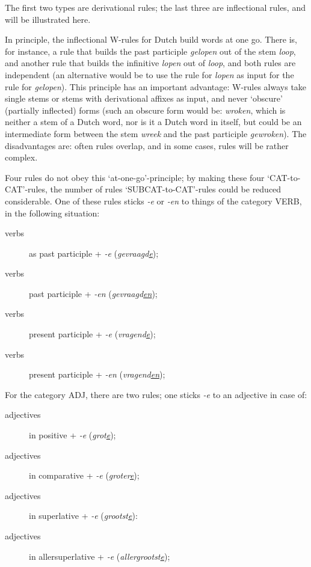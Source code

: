 The first two types are derivational rules; the last three are inflectional
rules, and will be illustrated here.

In principle, the inflectional W-rules for Dutch build words at one go. 
There is, for instance, a rule that builds the past participle {\em gelopen} 
out of the stem {\em loop}, and another rule that builds the infinitive 
{\em lopen} out of {\em loop}, and both rules are independent (an alternative 
would be to use the rule for {\em lopen} as input for the rule for 
{\em gelopen}).
This principle has an important advantage: W-rules always take 
single stems or stems 
with derivational affixes as input, and never `obscure' (partially inflected) 
forms (such an obscure form would be: {\em wroken}, which is neither a stem of 
a Dutch word, nor is it a Dutch word in itself, but
could be an intermediate form between the stem {\em wreek} and the past 
participle
{\em gewroken}). The disadvantages are: often rules overlap, and in some cases,
rules will be rather complex.

Four rules do not obey this `at-one-go'-principle; by making these four
`CAT-to-CAT'-rules, the number of rules `SUBCAT-to-CAT'-rules could be
reduced considerable. One of these rules sticks {\em -e} or {\em -en} 
to things of the category VERB, in the following situation:

\begin{description}
  \item [verbs] as past participle + {\em -e}   ({\em gevraagd\underline{e}});
  \item [verbs] past participle + {\em -en}  ({\em gevraagd\underline{en}});
  \item [verbs] present participle + {\em -e}   ({\em vragend\underline{e}});
  \item [verbs] present participle + {\em -en}  ({\em vragend\underline{en}});
\end{description}

For the category ADJ, there are two rules; one sticks {\em -e} to an adjective
in case of:

\begin{description}
  \item [adjectives] in positive     + {\em -e} ({\em grot\underline{e}});
  \item [adjectives] in comparative  + {\em -e} ({\em groter\underline{e}});
  \item [adjectives] in superlative  + {\em -e} ({\em grootst\underline{e}}):
  \item [adjectives] in allersuperlative + {\em -e} 
        ({\em allergrootst\underline{e}});
\end{description}


